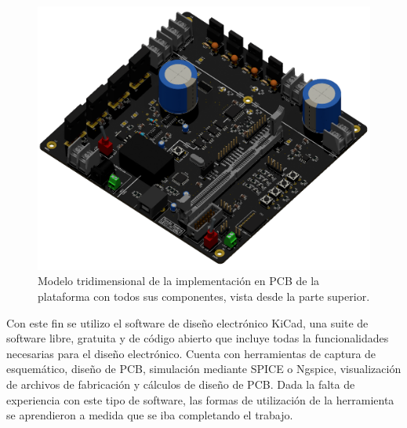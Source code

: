 \begin{figure}[h]
    \centering
    \includegraphics[scale=0.3]{Imagenes/PCB 3D Raytracing.png}
    \caption{Modelo tridimensional de la implementación en PCB de la plataforma
    con todos sus componentes, vista desde la parte superior.}
    \label{fig:plataforma_det}
\end{figure}

Con este fin se utilizo el software de diseño electrónico {\Medium KiCad}, una suite de software libre, gratuita y de código abierto que incluye todas la funcionalidades necesarias para el diseño electrónico. Cuenta con herramientas de captura de esquemático, diseño de PCB, simulación mediante SPICE o Ngspice, visualización de archivos de fabricación y cálculos de diseño de PCB. Dada la falta de experiencia con este tipo de software, las formas de utilización de la herramienta se aprendieron a medida que se iba completando el trabajo.\\

\newpage



\newpage


